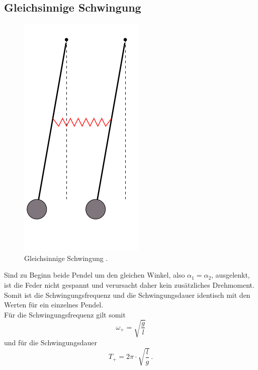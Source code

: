 \subsection{Gleichsinnige Schwingung}
\FloatBarrier
\begin{figure}
	\centering
	\includegraphics[width=0.4\linewidth]{Bilder/gleichphasig.png}
	\caption{Gleichsinnige Schwingung \cite{Anleitung}.}
	\label{fig:gleich}
\end{figure}
\FloatBarrier
Sind zu Beginn beide Pendel um den gleichen Winkel, also $\alpha_1=\alpha_2$, ausgelenkt, ist die Feder nicht gespannt und verursacht daher kein zusätzliches Drehmoment.
Somit ist die Schwingungsfrequenz und die Schwingungsdauer identisch mit den Werten für ein einzelnes Pendel.\\
Für die Schwingungsfrequenz gilt somit
\begin{equation}
	\label{eqn:wgleich}
	\omega_{\mathrm{+}}=\sqrt{\frac{g}{l}}
\end{equation}
und für die Schwingungsdauer
\begin{equation}
	\label{eqn:tgleich}
	T_{\mathrm{+}}=2\pi\cdot\sqrt{\frac{l}{g}} \, \text{.}
\end{equation}


